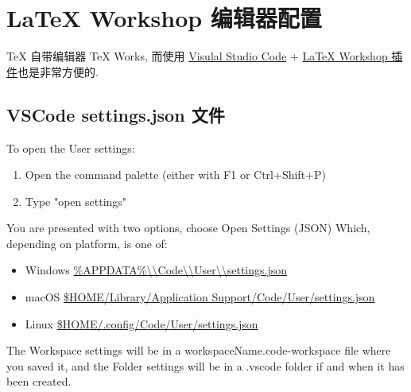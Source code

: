 \chapter{{\LaTeX} Workshop 编辑器配置}

{\TeX} 自带编辑器 {\TeX} Works, 而使用 \href{https://code.visualstudio.com/}{Visulal Studio Code} +
\href{https://github.com/James-Yu/LaTeX-Workshop}{{\LaTeX} Workshop 插件}也是非常方便的.

\section{VSCode settings.json 文件}

To open the User settings:

\begin{enumerate}
    \item Open the command palette (either with F1 or Ctrl+Shift+P)
    \item Type "open settings"
\end{enumerate}

You are presented with two options, choose Open Settings (JSON)
Which, depending on platform, is one of:
\begin{itemize}
    \item Windows \url{\%APPDATA\%\\Code\\User\\settings.json}
    \item macOS \url{$HOME/Library/Application Support/Code/User/settings.json}
    \item Linux \url{$HOME/.config/Code/User/settings.json}
\end{itemize}

The Workspace settings will be in a {workspaceName}.code-workspace file where you saved it, and the Folder settings will be in a .vscode folder if and when it has been created.

